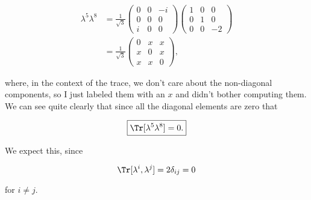 \section{}

\begin{align}
  \lambda^5\lambda^8 &= \frac{1}{\sqrt{3}} \begin{pmatrix}0 & 0 & -i \\ 0 & 0 & 0 \\ i & 0 & 0\end{pmatrix}\begin{pmatrix}1 & 0 & 0 \\ 0 & 1 & 0 \\ 0 & 0 & -2\end{pmatrix} \\
  &= \frac{1}{\sqrt{3}}\begin{pmatrix}0 & x & x \\ x & 0 & x \\ x & x & 0\end{pmatrix},
\end{align}

where, in the context of the trace, we don't care about the non-diagonal components, so I just labeled them with an $x$ and didn't bother computing them. We can see quite clearly that since all the diagonal elements are zero that

\begin{equation}
  \boxed{\Tr[\lambda^5\lambda^8] = 0.}
\end{equation}

We expect this, since

\begin{equation}
  \Tr[\lambda^i,\lambda^j] = 2\delta_{ij} = 0
\end{equation}

for $i \neq j$.








